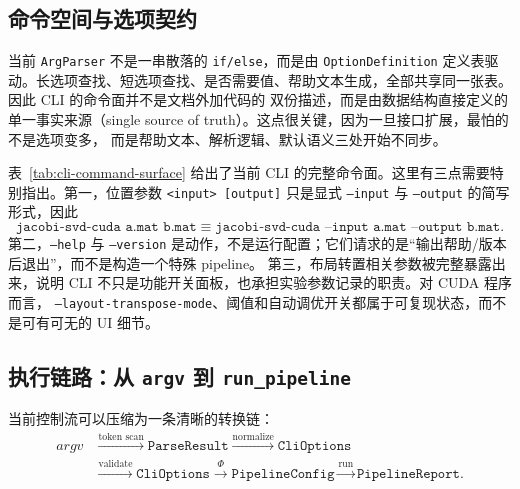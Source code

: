 \subsection{命令空间与选项契约}

当前 \texttt{ArgParser} 不是一串散落的 \texttt{if/else}，而是由 \texttt{OptionDefinition}
定义表驱动。长选项查找、短选项查找、是否需要值、帮助文本生成，全部共享同一张表。因此 CLI 的命令面并不是文档外加代码的
双份描述，而是由数据结构直接定义的单一事实来源（single source of truth）。这点很关键，因为一旦接口扩展，最怕的不是选项变多，
而是帮助文本、解析逻辑、默认语义三处开始不同步。



表~\ref{tab:cli-command-surface} 给出了当前 CLI 的完整命令面。这里有三点需要特别指出。第一，位置参数
\texttt{<input> [output]} 只是显式 \texttt{--input} 与 \texttt{--output} 的简写形式，因此
\[
    \texttt{jacobi-svd-cuda a.mat b.mat}
    \equiv
    \texttt{jacobi-svd-cuda --input a.mat --output b.mat}.
\]
第二，\texttt{--help} 与 \texttt{--version} 是动作，不是运行配置；它们请求的是“输出帮助/版本后退出”，而不是构造一个特殊 pipeline。
第三，布局转置相关参数被完整暴露出来，说明 CLI 不只是功能开关面板，也承担实验参数记录的职责。对 CUDA 程序而言，
\texttt{--layout-transpose-mode}、阈值和自动调优开关都属于可复现状态，而不是可有可无的 UI 细节。

\subsection{执行链路：从 \texttt{argv} 到 \texttt{run\_pipeline}}

当前控制流可以压缩为一条清晰的转换链：
\[
    \begin{aligned}
        argv
         & \xrightarrow{\text{token scan}}
        \texttt{ParseResult}
        \xrightarrow{\text{normalize}}
        \texttt{CliOptions}                \\
         & \xrightarrow{\text{validate}}
        \texttt{CliOptions}
        \xrightarrow{\Phi}
        \texttt{PipelineConfig}
        \xrightarrow{\text{run}}
        \texttt{PipelineReport}.
    \end{aligned}
\]

